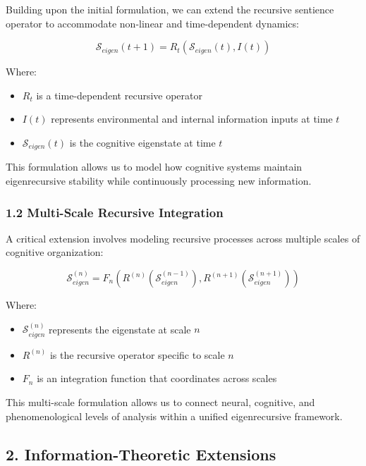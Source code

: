 \documentclass[
]{article}
\providecommand{\tightlist}{%
  \setlength{\itemsep}{0pt}\setlength{\parskip}{0pt}}
\begin{document}
Building upon the initial formulation, we can extend the recursive
sentience operator to accommodate non-linear and time-dependent
dynamics:

\[\mathcal{S}_{eigen}(t+1) = R_t(\mathcal{S}_{eigen}(t), I(t))\]

Where:

\begin{itemize}
\tightlist
\item
  \(R_t\) is a time-dependent recursive operator
\item
  \(I(t)\) represents environmental and internal information inputs at
  time \(t\)
\item
  \(\mathcal{S}_{eigen}(t)\) is the cognitive eigenstate at time \(t\)
\end{itemize}

This formulation allows us to model how cognitive systems maintain
eigenrecursive stability while continuously processing new information.

\subsubsection{1.2 Multi-Scale Recursive
Integration}\label{multi-scale-recursive-integration-1}

A critical extension involves modeling recursive processes across
multiple scales of cognitive organization:

\[\mathcal{S}_{eigen}^{(n)} = F_n(R^{(n)}(\mathcal{S}_{eigen}^{(n-1)}), R^{(n+1)}(\mathcal{S}_{eigen}^{(n+1)}))\]

Where:

\begin{itemize}
\tightlist
\item
  \(\mathcal{S}_{eigen}^{(n)}\) represents the eigenstate at scale \(n\)
\item
  \(R^{(n)}\) is the recursive operator specific to scale \(n\)
\item
  \(F_n\) is an integration function that coordinates across scales
\end{itemize}

This multi-scale formulation allows us to connect neural, cognitive, and
phenomenological levels of analysis within a unified eigenrecursive
framework.

\subsection{2. Information-Theoretic
Extensions}\label{information-theoretic-extensions}
\end{document}
